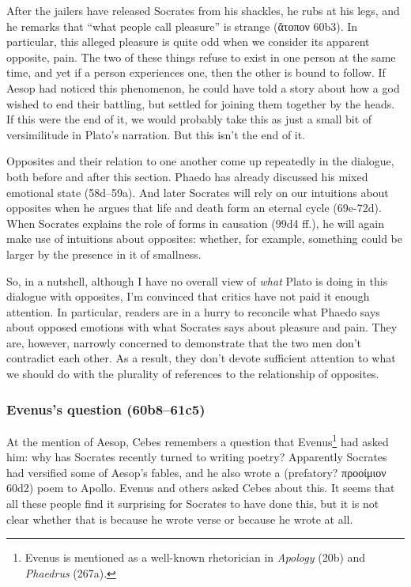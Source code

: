 \documentclass[12pt,letterpaper]{article}
\begin{document}
After the jailers have released Socrates from his shackles, he rubs at his legs, and he remarks that ``what people call pleasure'' is strange (\textgreek{ἄτοπον} 60b3). In particular, this alleged pleasure is quite odd when we consider its apparent opposite, pain. The two of these things refuse to exist in one person at the same time, and yet if a person experiences one, then the other is bound to follow. If Aesop had noticed this phenomenon, he could have told a story about how a god wished to end their battling, but settled for joining them together by the heads. If this were the end of it, we would probably take this as just a small bit of versimilitude in Plato's narration. But this isn't the end of it.

Opposites and their relation to one another come up repeatedly in the dialogue, both before and after this section. Phaedo has already discussed his mixed emotional state (58d--59a). And later Socrates will rely on our intuitions about opposites when he argues that life and death form an eternal cycle (69e-72d). When Socrates explains the role of forms in causation (99d4 ff.), he will again make use of intuitions about opposites: whether, for example, something could be larger by the presence in it of smallness.

So, in a nutshell, although I have no overall view of \textit{what} Plato is doing in this dialogue with opposites, I'm convinced that critics have not paid it enough attention. In particular, readers are in a hurry to reconcile what Phaedo says about opposed emotions with what Socrates says about pleasure and pain. They are, however, narrowly concerned to demonstrate that the two men don't contradict each other. As a result, they don't devote sufficient attention to what we should do with the plurality of references to the relationship of opposites.

\subsubsection{Evenus's question (60b8--61c5)}

At the mention of Aesop, Cebes remembers a question that Evenus\footnote{Evenus is mentioned as a well-known rhetorician in \textit{Apology} (20b) and \textit{Phaedrus} (267a).} had asked him: why has Socrates recently turned to writing poetry? Apparently Socrates had versified some of Aesop's fables, and he also wrote a (prefatory? \textgreek{προοίμιον} 60d2) poem to Apollo. Evenus and others asked Cebes about this. It seems that all these people find it surprising for Socrates to have done this, but it is not clear whether that is because he wrote verse or because he wrote at all.
\end{document}
